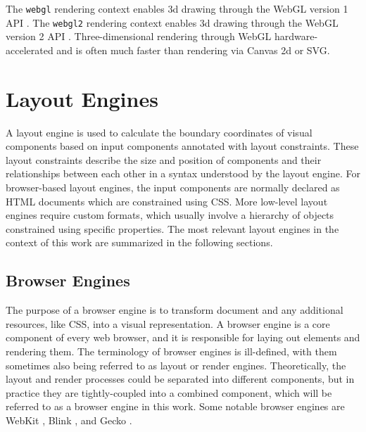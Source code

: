 The \lstinline{webgl} rendering context enables 3d drawing through the
WebGL version 1 API \parencite{WebGL1}. The \lstinline{webgl2}
rendering context enables 3d drawing through the WebGL version 2 API
\parencite{WebGL2}. Three-dimensional rendering through WebGL
hardware-accelerated and is often much faster than rendering via
Canvas 2d or SVG.

%









\section{Layout Engines}
\label{sec:LayoutEngines}

A layout engine is used to calculate the boundary coordinates of
visual components based on input components annotated with layout
constraints. These layout constraints describe the size and position
of components and their relationships between each other in a syntax
understood by the layout engine. For browser-based layout engines, the
input components are normally declared as HTML documents which are
constrained using CSS. More low-level layout engines require custom
formats, which usually involve a hierarchy of objects constrained
using specific properties. The most relevant layout engines in the
context of this work are summarized in the following sections.


\subsection{Browser Engines}
\label{sec:BrowserEngines}

The purpose of a browser engine is to transform document and any
additional resources, like CSS, into a visual representation. A
browser engine is a core component of every web browser, and it is
responsible for laying out elements and rendering them.  The
terminology of browser engines is ill-defined, with them sometimes
also being referred to as layout or render engines. Theoretically, the
layout and render processes could be separated into different
components, but in practice they are tightly-coupled into a combined
component, which will be referred to as a browser engine in this work.
Some notable browser engines are WebKit \parencite{WebKit}, Blink
\parencite{Blink}, and Gecko \parencite{Gecko}.

